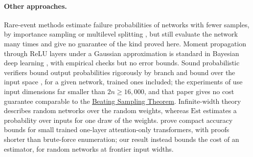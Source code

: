 \documentclass[10pt]{article}
\newcommand{\bst}{\hyperref[thm:main]{Beating Sampling Theorem}}
\newcommand{\Est}{\mathrm{Est}}
\begin{document}
\paragraph{Other approaches.}
Rare-event methods estimate failure probabilities of networks with fewer
samples, by importance sampling or multilevel
splitting \citep{webb-2019,wu-hilton-2025-rare}, but still evaluate the network many
times and give no guarantee of the kind proved here. Moment propagation
through ReLU layers under a Gaussian approximation is standard in Bayesian
deep learning \citep{wu-2019-dvi}, with empirical checks but no error bounds. Sound probabilistic
verifiers bound output probabilities rigorously by branch and bound over the
input space \citep{boetius-2025}, for a given network, trained ones included;
the experiments of \citet{boetius-2025} use input dimensions far smaller than
$2n\ge16{,}000$, and that paper gives no cost guarantee comparable to
the \bst{}. Infinite-width theory \citep{matthews-2018,lee-2018-nngp,hanin-2023}
describes random networks over the random weights, whereas $\Est$
estimates a probability over inputs for one draw of the weights. \citet{gross-2024-compact} prove compact accuracy bounds for small trained one-layer attention-only
transformers, with proofs shorter than brute-force enumeration; our result
instead bounds the cost of an estimator, for random networks at frontier
input widths.
\end{document}
